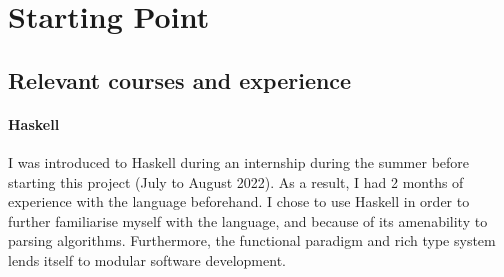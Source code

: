 \documentclass[12pt,a4paper,twoside,openright]{report} \usepackage[pdfborder={0 0 0}]{hyperref}    %
\theoremstyle{definition} \newtheorem{definition}{Definition}[section]
\begin{document}
%
\section{Starting Point}

\subsection{Relevant courses and experience}

\paragraph{Haskell}{I was introduced to Haskell during an internship during the summer before starting this project
(July to August 2022). As a result, I had 2 months of experience with the language beforehand. I chose to use Haskell in
order to further familiarise myself with the language, and because of its amenability to parsing algorithms.
Furthermore, the functional paradigm and rich type system lends itself to modular software development.}
\end{document}
